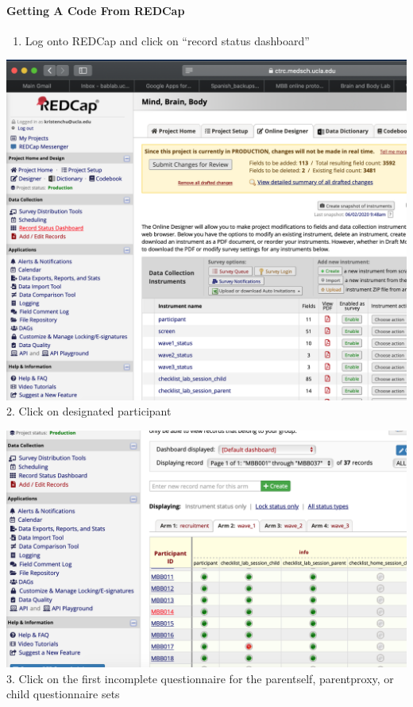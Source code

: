 \documentclass[]{book}
\providecommand{\tightlist}{%
  \setlength{\itemsep}{0pt}\setlength{\parskip}{0pt}}
\let\oldparagraph\paragraph
\renewcommand{\paragraph}[1]{\oldparagraph{#1}\mbox{}}
\begin{document}
\hypertarget{getting-a-code-from-redcap}{%
\paragraph{Getting A Code From REDCap}\label{getting-a-code-from-redcap}}

\begin{enumerate}
\def\labelenumi{\arabic{enumi}.}
\tightlist
\item
  Log onto REDCap and click on ``record status dashboard''
\end{enumerate}

\includegraphics{images/redcap_code/1.png}
2. Click on designated participant

\includegraphics{images/redcap_code/2.png}
3. Click on the first incomplete questionnaire for the parentself, parentproxy, or child questionnaire sets
\end{document}
